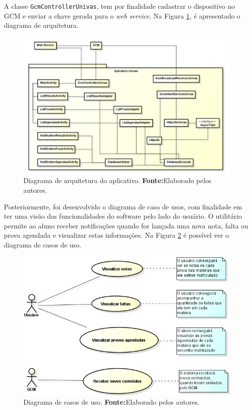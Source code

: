 	\par A classe \texttt{GcmControllerUnivas}, tem por finalidade cadastrar o
dispositivo no GCM e enviar a chave gerada para o \textit{web service}. Na
Figura \ref{fig:app}, é apresentado o diagrama de arquitetura.

	\begin{figure}[h!] 
		\centerline{\includegraphics[scale=0.42]{./imagens/2_q_metodologico/4_procedimentos_resultados/42_aplicativo/app.png}}
		\caption[Diagrama de arquitetura do aplicativo]{Diagrama de arquitetura do aplicativo.
		\textbf{Fonte:}Elaborado pelos autores.}
		\label{fig:app}
	\end{figure}
	
	\par Posteriormente, foi desenvolvido o diagrama de caso de usos, com
finalidade em ter uma visão das funcionalidades do software pelo lado do
usuário. O utilitário permite ao aluno receber notificações quando for lançada
uma nova nota, falta ou prova agendada e visualizar estas informações. Na
Figura \ref{fig:app1} é possível ver o diagrama de casos de uso.

	\begin{figure}[h!] 
		\centerline{\includegraphics[scale=0.7]{./imagens/2_q_metodologico/4_procedimentos_resultados/42_aplicativo/app1.png}}
		\caption[Diagrama de casos de uso]{Diagrama de casos de uso.
		\textbf{Fonte:}Elaborado pelos autores.}
		\label{fig:app1}
	\end{figure}
	
